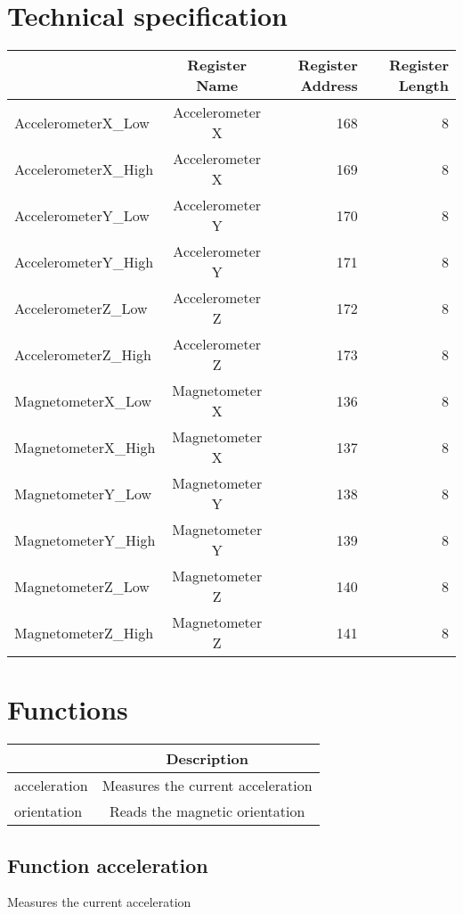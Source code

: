 \documentclass[a4paper,12pt,oneside,pdflatex,italian,final,twocolumn]{article}
\begin{document}
\section{Technical specification}
\centering
\begin{tabular}{lcrr}
\toprule
 & Register Name & Register Address & Register Length \\
\midrule
AccelerometerX\_Low & Accelerometer X & 168 & 8 \\
AccelerometerX\_High & Accelerometer X & 169 & 8 \\
AccelerometerY\_Low & Accelerometer Y & 170 & 8 \\
AccelerometerY\_High & Accelerometer Y & 171 & 8 \\
AccelerometerZ\_Low & Accelerometer Z & 172 & 8 \\
AccelerometerZ\_High & Accelerometer Z & 173 & 8 \\
MagnetometerX\_Low & Magnetometer X & 136 & 8 \\
MagnetometerX\_High & Magnetometer X & 137 & 8 \\
MagnetometerY\_Low & Magnetometer Y & 138 & 8 \\
MagnetometerY\_High & Magnetometer Y & 139 & 8 \\
MagnetometerZ\_Low & Magnetometer Z & 140 & 8 \\
MagnetometerZ\_High & Magnetometer Z & 141 & 8 \\
\bottomrule
\end{tabular}

\raggedright


\section{Functions}

\centering
\begin{tabular}{lc}
\toprule
  & Description \\
\midrule
acceleration & Measures the current acceleration \\
orientation & Reads the magnetic orientation \\
\bottomrule
\end{tabular}


\raggedright
\subsection{Function acceleration }
Measures the current acceleration \\
\end{document}
